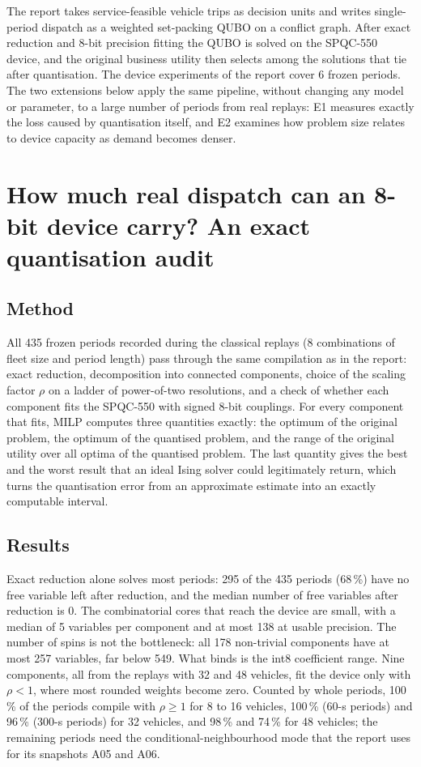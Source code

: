 The report takes service-feasible vehicle trips as decision units and writes single-period dispatch as a weighted set-packing QUBO on a conflict graph. After exact reduction and 8-bit precision fitting the QUBO is solved on the SPQC-550 device, and the original business utility then selects among the solutions that tie after quantisation. The device experiments of the report cover 6 frozen periods. The two extensions below apply the same pipeline, without changing any model or parameter, to a large number of periods from real replays: E1 measures exactly the loss caused by quantisation itself, and E2 examines how problem size relates to device capacity as demand becomes denser.

\section{How much real dispatch can an 8-bit device carry? An exact quantisation audit}

\subsection{Method}
All 435 frozen periods recorded during the classical replays (8 combinations of fleet size and period length) pass through the same compilation as in the report: exact reduction, decomposition into connected components, choice of the scaling factor $\rho$ on a ladder of power-of-two resolutions, and a check of whether each component fits the SPQC-550 with signed 8-bit couplings. For every component that fits, MILP computes three quantities exactly: the optimum of the original problem, the optimum of the quantised problem, and the range of the original utility over all optima of the quantised problem. The last quantity gives the best and the worst result that an ideal Ising solver could legitimately return, which turns the quantisation error from an approximate estimate into an exactly computable interval.

\subsection{Results}
Exact reduction alone solves most periods: 295 of the 435 periods (68\,\%) have no free variable left after reduction, and the median number of free variables after reduction is 0. The combinatorial cores that reach the device are small, with a median of 5 variables per component and at most 138 at usable precision. The number of spins is not the bottleneck: all 178 non-trivial components have at most 257 variables, far below 549. What binds is the int8 coefficient range. Nine components, all from the replays with 32 and 48 vehicles, fit the device only with $\rho<1$, where most rounded weights become zero. Counted by whole periods, 100\,\% of the periods compile with $\rho\geq 1$ for 8 to 16 vehicles, 100\,\% (60-s periods) and 96\,\% (300-s periods) for 32 vehicles, and 98\,\% and 74\,\% for 48 vehicles; the remaining periods need the conditional-neighbourhood mode that the report uses for its snapshots A05 and A06.

